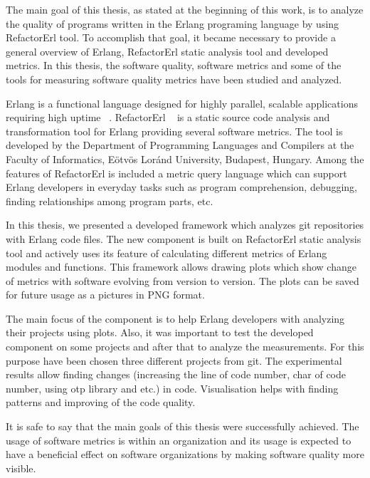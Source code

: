 The main goal of this thesis, as stated at the beginning of this work, is to analyze the quality of programs written in the Erlang programing language by using RefactorErl tool. To accomplish that goal, it became necessary to provide a general overview of Erlang, RefactorErl static analysis tool and developed metrics. In this thesis, the software quality, software metrics and some of the tools for measuring software quality metrics have been studied and analyzed.

Erlang is a functional language designed for highly parallel, scalable applications requiring high uptime ~\cite{refactorerlimp}. RefactorErl ~\cite{refactorerl} is a static source code analysis and transformation tool for Erlang providing several software metrics. The tool is developed by the Department of Programming Languages and Compilers at the Faculty of Informatics, Eötvös Loránd University, Budapest, Hungary. Among the features of RefactorErl is included a metric query language which can support Erlang developers in everyday tasks such as program comprehension, debugging, finding relationships among program parts, etc.

In this thesis, we presented a developed framework which analyzes git repositories with Erlang code files. The new component is built on RefactorErl static analysis tool and actively uses its feature of calculating different metrics of Erlang modules and functions. This framework allows drawing plots which show change of metrics with software evolving from version to version. The plots can be saved for future usage as a pictures in PNG format. 

The main focus of the component is to help Erlang developers with analyzing their projects using plots. Also, it was important to test the developed component on some projects and after that to analyze the measurements. For this purpose have been chosen three different projects from git. The experimental results allow finding changes (increasing the line of code number, char of code number, using otp library and etc.) in code. Visualisation helps with finding patterns and improving of the code quality.

It is safe to say that the main goals of this thesis were successfully achieved. The usage of software metrics is within an organization and its usage is expected to have a beneficial effect on software organizations by making software quality more visible.